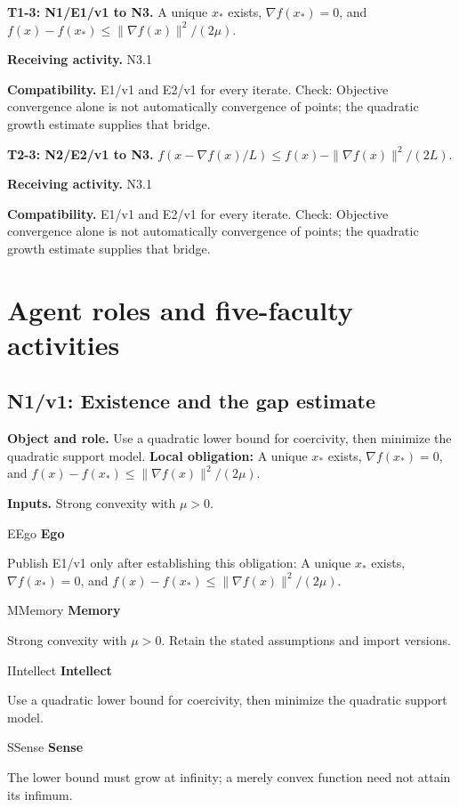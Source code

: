 \documentclass[preprint,12pt,aps,pra,showkeys,amsmath,amssymb,superscriptaddress,floatfix]{revtex4-2}
\theoremstyle{definition}
\theoremstyle{remark}
\newcommand{\mmfaculty}[3]{%
 \begin{mmfacultybox}{#1}{#2}
 {\sffamily\bfseries\color{MMBlue}#2}\par\smallskip #3
 \end{mmfacultybox}}
\newcommand{\field}[2]{\par\smallskip\noindent\textbf{#1.} #2\par}
\begin{document}
\begingroup\small\linespread{1.05}\selectfont

\field{T1-3: N1/E1/v1 to N3}{A unique \(x_*\) exists, \(\nabla f(x_*)=0\), and
\(f(x)-f(x_*)\le\|\nabla f(x)\|^2/(2\mu)\).}

\field{Receiving activity}{N3.1}

\field{Compatibility}{E1/v1 and E2/v1 for every iterate. Check: Objective convergence alone is
not automatically convergence of points; the quadratic growth estimate
supplies that bridge.}

\field{T2-3: N2/E2/v1 to N3}{\(f(x-\nabla f(x)/L)\le f(x)-\|\nabla f(x)\|^2/(2L)\).}

\field{Receiving activity}{N3.1}

\field{Compatibility}{E1/v1 and E2/v1 for every iterate. Check: Objective convergence alone is
not automatically convergence of points; the quadratic growth estimate
supplies that bridge.}

\endgroup

\clearpage\section{Agent roles and five-faculty activities}\begingroup\small\linespread{1.05}\selectfont{}

\subsection{N1/v1: Existence and the gap estimate}

\field{Object and role}{Use a quadratic lower bound for coercivity, then minimize the quadratic
support model. \textbf{Local obligation:} A unique \(x_*\) exists,
\(\nabla f(x_*)=0\), and \(f(x)-f(x_*)\le\|\nabla f(x)\|^2/(2\mu)\).}

\field{Inputs}{Strong convexity with \(\mu>0\).}

\mmfaculty{E}{Ego}{Publish E1/v1 only after establishing this obligation: A unique \(x_*\)
exists, \(\nabla f(x_*)=0\), and
\(f(x)-f(x_*)\le\|\nabla f(x)\|^2/(2\mu)\).}

\mmfaculty{M}{Memory}{Strong convexity with \(\mu>0\). Retain the stated assumptions and
import versions.}

\mmfaculty{I}{Intellect}{Use a quadratic lower bound for coercivity, then minimize the quadratic
support model.}

\mmfaculty{S}{Sense}{The lower bound must grow at infinity; a merely convex function need not
attain its infimum.}
\end{document}
